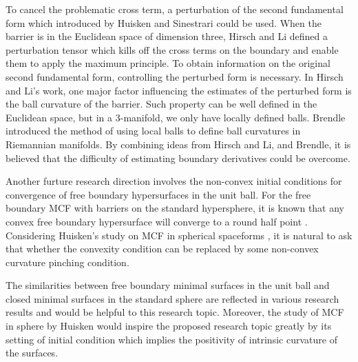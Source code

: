 To cancel the problematic cross term, a perturbation of the second fundamental form which introduced by Huisken and Sinestrari \cite{huisken_convexity_1999} could be used. When the barrier is in the Euclidean space of dimension three, Hirsch and Li \cite{hirsch2020contracting} defined a perturbation tensor which kills off the cross terms on the boundary and enable them to apply the maximum principle. To obtain information on the original second fundamental form, controlling the perturbed form is necessary. In Hirsch and Li’s work, one major factor influencing the estimates of the perturbed form is the ball curvature of the barrier. Such property can be well defined in the Euclidean space, but in a 3-manifold, we only have locally defined balls. Brendle \cite{brendle2013inscribed} introduced the method of using local balls to define ball curvatures in Riemannian manifolds. By combining ideas from Hirsch and Li, and Brendle, it is believed that the difficulty of estimating boundary derivatives could be overcome.

Another furture research direction involves the non-convex initial conditions for convergence of free boundary hypersurfaces in the unit ball. For the free boundary MCF with barriers on the standard hypersphere, it is known that any convex free boundary hypersurface will converge to a round half point \cite{stahl_convergence_1996}. Considering Huisken’s study on MCF in spherical spaceforms \cite{huisken_deforming_1987}, it is natural to ask that whether the convexity condition can be replaced by some non-convex curvature pinching condition.

The similarities between free boundary minimal surfaces in the unit ball and closed minimal surfaces in the standard sphere are reflected in various research results \cite{almgren_interior_1966,nitsche_stationary_1985,Ros_stabilityof} and would be helpful to this research topic. Moreover, the study of MCF in sphere by Huisken \cite{huisken_deforming_1987} would inspire the proposed research topic greatly by its setting of initial condition which implies the positivity of intrinsic curvature of the surfaces.











\chapterend

